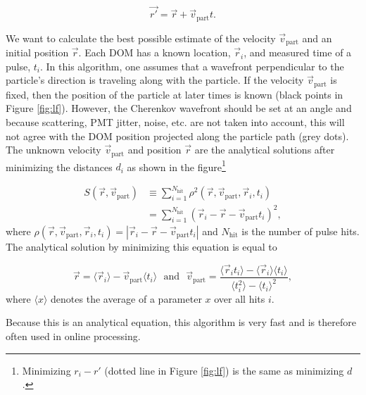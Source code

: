 \begin{equation}
\vec{r'} = \vec{r} + \vec{v}_{\textrm{part}}t.
\end{equation}

\noindent We want to calculate the best possible estimate of the velocity $\vec{v}_\textrm{part}$ and an initial position $\vec{r}$. Each DOM has a known location, $\vec{r}_i$, and measured time of a pulse, $t_i$. In this algorithm, one assumes that a wavefront perpendicular to the particle's direction is traveling along with the particle. If the velocity $\vec{v}_\textrm{part}$ is fixed, then the position of the particle at later times is known (black points in Figure \ref{fig:lf}). However, the Cherenkov wavefront should be set at an angle and because scattering, PMT jitter, noise, etc. are not taken into account, this will not agree with the DOM position projected along the particle path (grey dots). The unknown velocity $\vec{v}_\textrm{part}$ and position $\vec{r}$ are the analytical solutions after minimizing the distances $d_i$ as shown in the figure\footnote{Minimizing $r_i - r'$ (dotted line in Figure \ref{fig:lf}) is the same as minimizing $d$.}

\begin{equation}
\label{eq:lf}
\begin{split}
S(\vec{r},\vec{v}_{\textrm{part}}) &\equiv \sum^{N_{\textrm{hit}}}_{i=1} \rho^2(\vec{r},\vec{v}_\textrm{part},\vec{r}_i,t_i)\\
&= \sum^{N_{\textrm{hit}}}_{i=1} \left(\vec{r}_i - \vec{r} - \vec{v}_\textrm{part}t_i \right)^2,
\end{split}
\end{equation}
\noindent where $\rho(\vec{r},\vec{v}_\textrm{part},\vec{r}_i,t_i) = \left|\vec{r}_i - \vec{r} - \vec{v}_\textrm{part}t_i \right|$ and $N_\textrm{hit}$ is the number of pulse hits. The analytical solution by minimizing this equation is equal to

\begin{equation}
\vec{r} = \langle\vec{r}_i\rangle - \vec{v}_\textrm{part}\langle t_i\rangle \ \ \ \textrm{and}\ \ \ \vec{v}_\textrm{part} = \frac{\langle \vec{r}_i t_i\rangle - \langle \vec{r}_i \rangle \langle t_i \rangle }{\langle t_i^2 \rangle - \langle t_i \rangle^2},
\end{equation}
\noindent where $\langle x \rangle$ denotes the average of a parameter $x$ over all hits $i$.

Because this is an analytical equation, this algorithm is very fast and is therefore often used in online processing.
 
